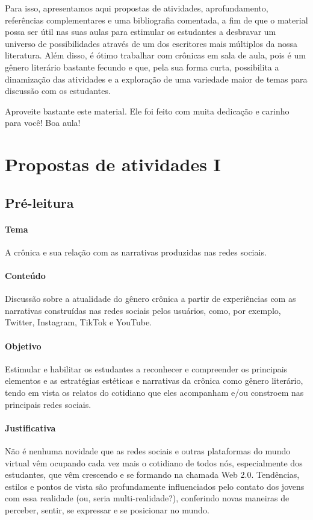 \documentclass{article}
\begin{document}
Para isso, apresentamos aqui propostas de atividades, aprofundamento,
referências complementares e uma bibliografia comentada, a fim de que o
material possa ser útil nas suas aulas para estimular os estudantes a
desbravar um universo de possibilidades através de um dos escritores
mais múltiplos da nossa literatura. Além disso, é ótimo trabalhar com
crônicas em sala de aula, pois é um gênero literário bastante fecundo e
que, pela sua forma curta, possibilita a dinamização das atividades e a
exploração de uma variedade maior de temas para discussão com os
estudantes.

Aproveite bastante este material. Ele foi feito com muita dedicação e
carinho para você! Boa aula!


\section{Propostas de atividades I}


\subsection{Pré-leitura}

\paragraph{Tema} A crônica e sua relação com as narrativas produzidas nas
  redes sociais.


\paragraph{Conteúdo} Discussão sobre a atualidade do gênero crônica a
partir de experiências com as narrativas construídas nas redes sociais
pelos usuários, como, por exemplo, Twitter, Instagram, TikTok e YouTube.

\paragraph{Objetivo} Estimular e habilitar os estudantes a reconhecer e
compreender os principais elementos e as estratégias estéticas e
narrativas da crônica como gênero literário, tendo em vista os relatos
do cotidiano que eles acompanham e/ou constroem nas principais redes
sociais.

\paragraph{Justificativa} Não é nenhuma novidade que as redes sociais e
outras plataformas do mundo virtual vêm ocupando cada vez mais o
cotidiano de todos nós, especialmente dos estudantes, que vêm crescendo
e se formando na chamada Web 2.0. Tendências, estilos e pontos de vista
são profundamente influenciados pelo contato dos jovens com essa
realidade (ou, seria multi-realidade?), conferindo novas maneiras de
perceber, sentir, se expressar e se posicionar no mundo.
\end{document}
